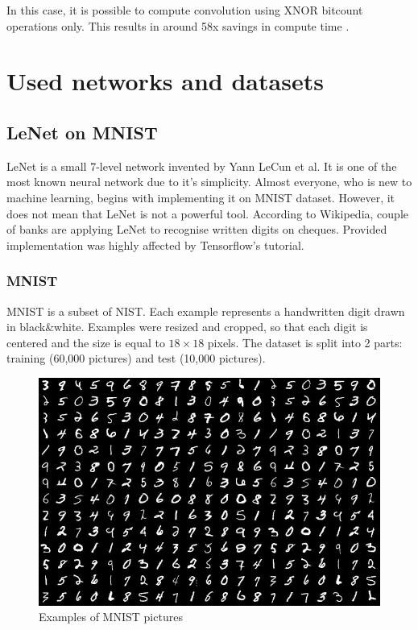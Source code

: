 \documentclass[licencjacka]{pracamgr}
\begin{document}
	    In this case, it is possible to compute convolution using XNOR bitcount operations only. This results in around 58x savings in compute time \cite{xnornet}.

\chapter{Used networks and datasets}
		\section{LeNet on MNIST}
 		LeNet is a small 7-level network invented by Yann LeCun et al. It is one of the most known neural network due to it’s simplicity. Almost everyone, who is new to machine learning, begins with implementing it on MNIST dataset. However, it does not mean that LeNet is not a powerful tool. According to Wikipedia, couple of banks are applying LeNet to recognise written digits on cheques. Provided implementation was highly affected by Tensorflow's tutorial. \\
 		\subsection{MNIST}
 			MNIST is a subset of NIST. Each example represents a handwritten digit drawn in black\&white. Examples were resized and cropped, so that each digit is centered and the size is equal to $18\times18$ pixels. The dataset is split into 2 parts: training (60,000 pictures) and test (10,000 pictures).
 			\begin{figure}[h]
				\caption{Examples of MNIST pictures}
				\centering
				\includegraphics[width=\textwidth]{images/mnist}
			\end{figure}
\end{document}
